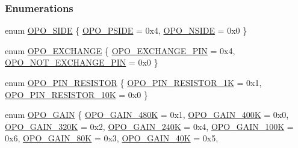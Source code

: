 \subsubsection*{Enumerations}
\begin{DoxyCompactItemize}
\item 
enum \mbox{\hyperlink{a00002_afb2207320139ac264d5cc1600d3cae9e}{O\+P\+O\+\_\+\+S\+I\+DE}} \{ \mbox{\hyperlink{a00002_afb2207320139ac264d5cc1600d3cae9ea740f1053bc0489a53c4cfe9bfc3de403}{O\+P\+O\+\_\+\+P\+S\+I\+DE}} = 0x4, 
\mbox{\hyperlink{a00002_afb2207320139ac264d5cc1600d3cae9eafd1c5b2cbd5e5a8866364e6af2dbd4c0}{O\+P\+O\+\_\+\+N\+S\+I\+DE}} = 0x0
 \}
\item 
enum \mbox{\hyperlink{a00002_af0663f5e9fee7a904ad95d1a4ecdaebd}{O\+P\+O\+\_\+\+E\+X\+C\+H\+A\+N\+GE}} \{ \mbox{\hyperlink{a00002_af0663f5e9fee7a904ad95d1a4ecdaebda8866b250a87989e76add11875358e4ae}{O\+P\+O\+\_\+\+E\+X\+C\+H\+A\+N\+G\+E\+\_\+\+P\+IN}} = 0x4, 
\mbox{\hyperlink{a00002_af0663f5e9fee7a904ad95d1a4ecdaebda4c251187b10da59c8696dbf4951b49d3}{O\+P\+O\+\_\+\+N\+O\+T\+\_\+\+E\+X\+C\+H\+A\+N\+G\+E\+\_\+\+P\+IN}} = 0x0
 \}
\item 
enum \mbox{\hyperlink{a00002_a4600c8687e3e17269633cb3fbd771af9}{O\+P\+O\+\_\+\+P\+I\+N\+\_\+\+R\+E\+S\+I\+S\+T\+OR}} \{ \mbox{\hyperlink{a00002_a4600c8687e3e17269633cb3fbd771af9a7b2e9c0067b4d8197ded8832c5615120}{O\+P\+O\+\_\+\+P\+I\+N\+\_\+\+R\+E\+S\+I\+S\+T\+O\+R\+\_\+1K}} = 0x1, 
\mbox{\hyperlink{a00002_a4600c8687e3e17269633cb3fbd771af9a07e5fc919ceeec7b688aa3389f985a28}{O\+P\+O\+\_\+\+P\+I\+N\+\_\+\+R\+E\+S\+I\+S\+T\+O\+R\+\_\+10K}} = 0x0
 \}
\item 
enum \mbox{\hyperlink{a00002_a6424f6db97a2e691b73af9c4053f1650}{O\+P\+O\+\_\+\+G\+A\+IN}} \{ \mbox{\hyperlink{a00002_a6424f6db97a2e691b73af9c4053f1650a2b7df29c5ca03fcca36f648dbd2dc95b}{O\+P\+O\+\_\+\+G\+A\+I\+N\+\_\+480K}} = 0x1, 
\mbox{\hyperlink{a00002_a6424f6db97a2e691b73af9c4053f1650ab647d5f1f3b13168dca7f204c08021a8}{O\+P\+O\+\_\+\+G\+A\+I\+N\+\_\+400K}} = 0x0, 
\mbox{\hyperlink{a00002_a6424f6db97a2e691b73af9c4053f1650afd00b530e99b17ea02716d355ecdd695}{O\+P\+O\+\_\+\+G\+A\+I\+N\+\_\+320K}} = 0x2, 
\mbox{\hyperlink{a00002_a6424f6db97a2e691b73af9c4053f1650ad9ddaa398b63e426eb6f7d6c721aa2af}{O\+P\+O\+\_\+\+G\+A\+I\+N\+\_\+240K}} = 0x4, 
\mbox{\hyperlink{a00002_a6424f6db97a2e691b73af9c4053f1650a1f2a22a037ee965a0b37a2f5c3eed0bc}{O\+P\+O\+\_\+\+G\+A\+I\+N\+\_\+100K}} = 0x6, 
\mbox{\hyperlink{a00002_a6424f6db97a2e691b73af9c4053f1650a42eb5c59d1b93acc89ceb144bbe3fca0}{O\+P\+O\+\_\+\+G\+A\+I\+N\+\_\+80K}} = 0x3, 
\mbox{\hyperlink{a00002_a6424f6db97a2e691b73af9c4053f1650adbde1c86d4a091e298c72418f7ccf5eb}{O\+P\+O\+\_\+\+G\+A\+I\+N\+\_\+40K}} = 0x5, 

\end{DoxyCompactItemize}
